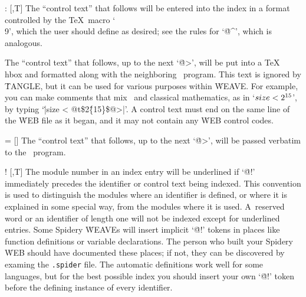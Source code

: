 \@: [\PAS,T] The ``control text'' that follows will be entered into the index
in a format controlled by the \TeX\ macro `\.{\\9}', which the user
should define as desired; see the rules for `\.{@\^}', which is analogous.

\@t [\PAS] The ``control text'' that follows, up to the next `\.{@>}', will
be put into a \TeX\ \.{\\hbox} and formatted along with the neighboring
\PASCAL\ program.
This text is ignored by \.{TANGLE}, but it can be used
for various purposes within \.{WEAVE}.
For example, you can make comments
that mix \PASCAL\ and classical mathematics, as in `$\\{size}<2^{15}$', by
typing `\.{|size < @t\$2\^\{15\}\$@>|}'.
A control text must end on the
same line of the \.{WEB} file as it began, and it may not contain any
\.{WEB} control codes.

\@= [\PAS] The ``control text'' that follows, up to the next `\.{@>}', will
be passed verbatim to the \PASCAL\ program.


\@! [\PAS,T] The module number in an index entry will be underlined if `\.{@!}'
immediately precedes the identifier or control text being indexed.
This
convention is used to distinguish the modules where an identifier is
defined, or where it is explained in some special way, from the modules
where it is used.
A~reserved word or an identifier of length one will not
be indexed except for underlined entries.
\newstuff
Some Spidery \.{WEAVE}s will insert implicit `\.{@!}' tokens in places
like function definitions or variable declarations.
The person who built your Spidery \.{WEB} should have documented these
places; if not, they can be discovered by examing the {\tt .spider}
file.
The automatic definitions work well for some languages, but
for the best possible index you should insert your own `\.{@!}' token before
the defining instance of every identifier.
\endnewstuff

